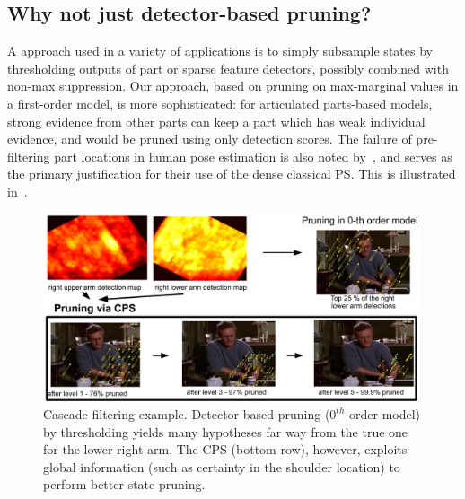 \subsection{Why not just detector-based pruning?} A \naive approach used in a 
variety of applications is to simply subsample states by thresholding outputs 
of part or sparse feature detectors, possibly combined with non-max 
suppression.  Our approach, based on pruning on max-marginal values in a 
first-order model, is more sophisticated: for articulated parts-based models, 
strong evidence from other parts can keep a part which has weak individual 
evidence, and would be pruned using only detection scores.  The failure of 
pre-filtering  part locations in human pose estimation is also noted 
by~\citet{andriluka09}, and serves as the primary justification for their use 
of the dense classical PS.  This is illustrated in~.

\begin{figure}[tb]
\begin{center}
\includegraphics[width=0.99\textwidth]{figs/cascade-pruning.pdf}
\caption[Cascade filtering example]{Cascade filtering example. Detector-based 
pruning ($0^{th}$-order model) by thresholding yields many hypotheses far way from 
the true one for the lower right arm. The CPS (bottom row), however, exploits 
global information (such as certainty in the shoulder location) to perform 
better state pruning.}
\label{fig:cascade-pruning}
\end{center}
\end{figure}




